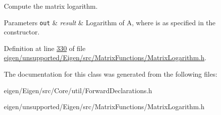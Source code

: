 Compute the matrix logarithm. 


\begin{DoxyParams}[1]{Parameters}
\mbox{\tt out}  & {\em result} & Logarithm of {\ttfamily A}, where  is as specified in the constructor. \\
\hline
\end{DoxyParams}


Definition at line \hyperlink{eigen_2unsupported_2_eigen_2src_2_matrix_functions_2_matrix_logarithm_8h_source_l00330}{330} of file \hyperlink{eigen_2unsupported_2_eigen_2src_2_matrix_functions_2_matrix_logarithm_8h_source}{eigen/unsupported/\+Eigen/src/\+Matrix\+Functions/\+Matrix\+Logarithm.\+h}.



The documentation for this class was generated from the following files\+:\begin{DoxyCompactItemize}
\item 
eigen/\+Eigen/src/\+Core/util/\+Forward\+Declarations.\+h\item 
eigen/unsupported/\+Eigen/src/\+Matrix\+Functions/\+Matrix\+Logarithm.\+h\end{DoxyCompactItemize}
